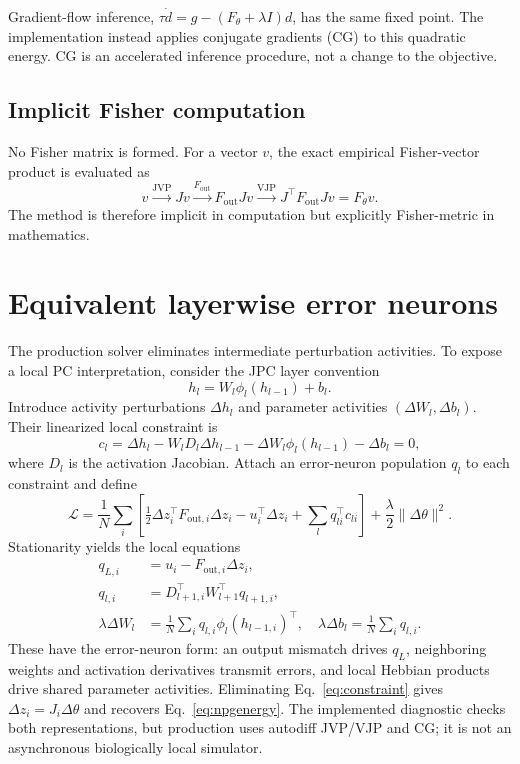 \documentclass{article}
\newcommand{\Fout}{F_{\mathrm{out}}}
\newcommand{\Fouti}{F_{\mathrm{out},i}}
\newcommand{\Fpol}{F_{\theta}}
\begin{document}
Gradient-flow inference, $\tau\dot d=g-(\Fpol+\lambda I)d$, has the same fixed point. The implementation instead applies conjugate gradients (CG) to this quadratic energy. CG is an accelerated inference procedure, not a change to the objective.

\subsection{Implicit Fisher computation}

No Fisher matrix is formed. For a vector $v$, the exact empirical Fisher-vector product is evaluated as
\begin{equation}
v\xrightarrow{\mathrm{JVP}}Jv
\xrightarrow{\Fout}\Fout Jv
\xrightarrow{\mathrm{VJP}}J^\top\Fout Jv=\Fpol v.
\label{eq:fvp}
\end{equation}
The method is therefore implicit in computation but explicitly Fisher-metric in mathematics.

\section{Equivalent layerwise error neurons}

The production solver eliminates intermediate perturbation activities. To expose a local PC interpretation, consider the JPC layer convention
\begin{equation}
h_l=W_l\phi_l(h_{l-1})+b_l.
\end{equation}
Introduce activity perturbations $\Delta h_l$ and parameter activities $(\Delta W_l,\Delta b_l)$. Their linearized local constraint is
\begin{equation}
c_l=\Delta h_l-W_lD_l\Delta h_{l-1}
-\Delta W_l\phi_l(h_{l-1})-\Delta b_l=0,
\label{eq:constraint}
\end{equation}
where $D_l$ is the activation Jacobian. Attach an error-neuron population $q_l$ to each constraint and define
\begin{equation}
\mathcal L=\frac1N\sum_i\left[
\tfrac12\Delta z_i^\top\Fouti\Delta z_i-u_i^\top\Delta z_i
+\sum_lq_{li}^\top c_{li}\right]+\frac\lambda2\|\Delta\theta\|^2.
\label{eq:lagrangian}
\end{equation}
Stationarity yields the local equations
\begin{align}
q_{L,i}&=u_i-\Fouti\Delta z_i, \\
q_{l,i}&=D_{l+1,i}^\top W_{l+1}^\top q_{l+1,i}, \\
\lambda\Delta W_l&=\frac1N\sum_iq_{l,i}\phi_l(h_{l-1,i})^\top,
\quad
\lambda\Delta b_l=\frac1N\sum_iq_{l,i}.
\label{eq:localstationarity}
\end{align}
These have the error-neuron form: an output mismatch drives $q_L$, neighboring weights and activation derivatives transmit errors, and local Hebbian products drive shared parameter activities. Eliminating Eq.~\eqref{eq:constraint} gives $\Delta z_i=J_i\Delta\theta$ and recovers Eq.~\eqref{eq:npgenergy}. The implemented diagnostic checks both representations, but production uses autodiff JVP/VJP and CG; it is not an asynchronous biologically local simulator.
\end{document}

